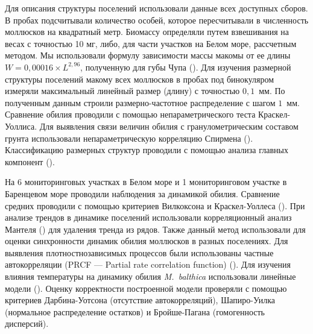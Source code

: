 Для описания структуры поселений использовали данные всех доступных сборов.
В пробах подсчитывали количество особей, которое пересчитывали в численность моллюсков на квадратный метр. 
Биомассу определяли путем взвешивания на весах с точностью 10 мг, либо, для части участков на Белом море, рассчетным методом.
Мы использовали формулу зависимости массы макомы от ее длины $W = 0,00016 \times L^{2,96}$, полученную для губы Чупа (\cite{Maximovich_et_al_1993}).
Для изучения размерной структуры поселений макому всех моллюсков в пробах под бинокуляром измеряли максимальный линейный размер (длину) с точностью $0,1$~мм.
По полученным данным строили размерно-частотное распределение с шагом $1$~мм.
Сравнение обилия проводили с помощью непараметрического теста Краскел-Уоллиса. 
Для выявления связи величин обилия с гранулометрическим составом грунта использовали непараметрическую корреляцию Спирмена (\cite{Hollander_et_al_2013}).
Классификацию размерных структур проводили с помощью анализа главных компонент (\cite{Mardia_et_al_1979}).

На 6 мониторинговых участках в Белом море и 1 мониторинговом участке в Баренцевом море проводили наблюдения за динамикой обилия.
Сравнение средних проводили с помощью критериев Вилкоксона и Краскел-Уоллеса (\cite{Hollander_et_al_2013}).
При анализе трендов в динамике поселений использовали корреляционный анализ Мантеля (\cite{Legendre_Legendre_2012}) для удаления тренда из рядов. 
Также данный метод использовали для оценки синхронности динамик обилия моллюсков в разных поселениях.
Для выявления плотностнозависимых процессов были использованы частные автокорреляции (PRCF --- Partial rate correlation function) (\cite{Berryman_Turchin_2001}).
Для изучения влияния температуры на динамику обилия \textit{M.~balthica} использовали линейные модели (\cite{Chambers_Hastie_1991}).
Оценку корректности построенной модели проверяли с помощью критериев Дарбина-Уотсона (отсутствие автокорреляций), Шапиро-Уилка (нормальное распределение остатков) и Бройше-Пагана (гомогенность дисперсий).

